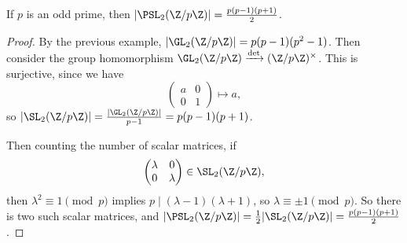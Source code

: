 \begin{lemma}
	If $p$ is an odd prime, then $|\PSL_2(\Z/p\Z)| = \frac{p(p - 1)(p + 1)}{2}$.
\end{lemma}
\begin{proof}
	By the previous example, $|\GL_2(\Z/p\Z)| = p(p-1)(p^2 - 1)$. Then consider the group homomorphism $\GL_2(\Z/p\Z) \xrightarrow{\det} (\Z/p\Z)^\times$. This is surjective, since we have
	$$
\begin{pmatrix}
	a & 0 \\
	0 & 1
\end{pmatrix} \longmapsto a,
	$$
	so $|\SL_2(\Z/p\Z)| = \frac{|\GL_2(\Z/p\Z)|}{p - 1} = p(p - 1)(p + 1)$.

	Then counting the number of scalar matrices, if
	$$
	\begin{pmatrix}
		\lambda & 0 \\ 0 & \lambda
	\end{pmatrix} \in \SL_2(\Z/p\Z),
	$$
	then $\lambda^2 \equiv 1\pmod{p}$ implies $p \mid (\lambda - 1)(\lambda + 1)$, so $\lambda \equiv \pm 1 \pmod{p}$. So there is two such scalar matrices, and $|\PSL_2(\Z/p\Z)| = \frac{1}{2}|\SL_2(\Z/p\Z)| = \frac{p(p - 1)(p + 1)}{2}$.
\end{proof}

